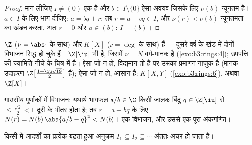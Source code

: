 \begin{proof}
मान लीजिए $I \neq (0)$ एक  है और $b \in I \setminus\{0\}$ ऐसा अवयव जिसके लिए $\nu(b)$
न्यूनतम है। $a \in I$ के लिए भाग दीजिए: $a = bq + r$; तब $r = a
- bq \in I$, और $\nu(r) < \nu(b)$
न्यूनतमता का खंडन करता, अतः $r = 0$ और $a \in (b)$: $I = (b)$।
\end{proof}

\begin{example}\label{ex:b3:rings:euclidean}
$\Z$ ($\nu = \abs\cdot$ के साथ) और $K[X]$ ($\nu = \deg$ के साथ)  हैं ---
दूसरे वर्ष के खंड में दोनों विभाजन सिद्ध हो चुके हैं। $\Z[\iu]$ भी
 है, जिसमें $\nu = N$ वर्ग-मानक है (\cref{exo:b3:rings:4}); उपपत्ति की
ज्यामिति नीचे के चित्र में है। ऐसा  जो  न हो,
विद्यमान तो है पर उसका प्रमाणन नाजुक है (मानक उदाहरण $\Z\bigl[\frac{1+\iu\sqrt{19}}2\bigr]$ है);
ऐसा  जो  न हो, आसान है: $K[X, Y]$ (\cref{exo:b3:rings:6}), अथवा $\Z[X]$।
\end{example}

\begin{omfigure}

{\small गाउसीय पूर्णांकों में विभाजन: यथार्थ भागफल $a/b \in \C$ किसी
जालक बिंदु $q \in \Z[\iu]$ से $\leq \frac{\sqrt2}{2} < 1$ दूरी के भीतर होता है; तब $r = a - bq$ के लिए
$N(r) =
N(b)\,\abs{a/b - q}^2 < N(b)$। एक  विभाजन, और उससे एक पूरा अंकगणित।}
\end{omfigure}

\begin{lemma}[मुख्य आदर्शों की आरोही शृंखलाएँ]
\label{lem:b3:rings:acc}
किसी  में आदर्शों का प्रत्येक बढ़ता हुआ अनुक्रम $I_1 \subseteq I_2
\subseteq \cdots$ अंततः
अचर हो जाता है।
\end{lemma}

